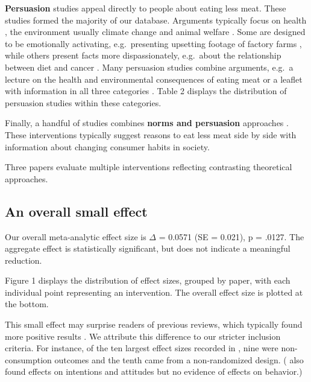 \documentclass[sn-nature,pdflatex]{sn-jnl}
\begin{document}
\textbf{Persuasion}
\citep{kanchanachitra2020, abrahamse2007, acharya2004, berndsen2005, bertolaso2015, bianchi2022, bochmann2017, bschaden2020, carfora2023, cooney2016, fehrenbach2015, feltz2022, haile2021, hatami2018, hennessy2016, mathur2021effectiveness, norris2014, peacock2017, polanco2022, sparkman2021, jalil2023, merrill2009, weingarten2022}
studies appeal directly to people about eating less meat. These studies
formed the majority of our database. Arguments typically focus on health
\citep{weingarten2022}, the environment \citep{carfora2023}
\textemdash usually climate change \textemdash and animal welfare
\citep{haile2021}. Some are designed to be emotionally activating,
e.g.~presenting upsetting footage of factory farms
\citep{bertolaso2015}, while others present facts more dispassionately,
e.g.~about the relationship between diet and cancer \citep{hatami2018}.
Many persuasion studies combine arguments, e.g.~a lecture on the health
and environmental consequences of eating meat \citep{jalil2023} or a
leaflet with information in all three categories \citep{hennessy2016}.
Table 2 displays the distribution of persuasion studies within these
categories.

Finally, a handful of studies combines \textbf{norms and persuasion}
approaches \citep{hennessy2016, carfora2023, mattson2020, piester2020}.
These interventions typically suggest reasons to eat less meat side by
side with information about changing consumer habits in society.

Three papers \citep[
\citet{kanchanachitra2020}]{piester2020, hennessey2016} evaluate
multiple interventions reflecting contrasting theoretical approaches.

\subsection{An overall small effect}\label{sec2.2}

Our overall meta-analytic effect size is \(\Delta\) = 0.0571 (SE =
0.021), p = .0127. The aggregate effect is statistically significant,
but does not indicate a meaningful reduction.

Figure 1 displays the distribution of effect sizes, grouped by paper,
with each individual point representing an intervention. The overall
effect size is plotted at the bottom.

This small effect may surprise readers of previous reviews, which
typically found more positive results
\citep{mathur2021meta, meier2022, chang2023}. We attribute this
difference to our stricter inclusion criteria. For instance, of the ten
largest effect sizes recorded in \citep{mathur2021effectiveness}, nine
were non-consumption outcomes and the tenth came from a non-randomized
design. (\citep{bianchi2018conscious} also found effects on intentions
and attitudes but no evidence of effects on behavior.)
\end{document}
